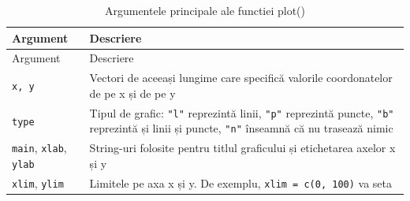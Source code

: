 \documentclass[]{article}
\begin{document}
\begin{longtable}[]{@{}ll@{}}
\caption{Argumentele principale ale functiei plot()}\tabularnewline
\toprule
\begin{minipage}[b]{0.18\columnwidth}\raggedright\strut
Argument\strut
\end{minipage} & \begin{minipage}[b]{0.67\columnwidth}\raggedright\strut
Descriere\strut
\end{minipage}\tabularnewline
\midrule
\endfirsthead
\toprule
\begin{minipage}[b]{0.18\columnwidth}\raggedright\strut
Argument\strut
\end{minipage} & \begin{minipage}[b]{0.67\columnwidth}\raggedright\strut
Descriere\strut
\end{minipage}\tabularnewline
\midrule
\endhead
\begin{minipage}[t]{0.18\columnwidth}\raggedright\strut
\texttt{x,\ y}\strut
\end{minipage} & \begin{minipage}[t]{0.67\columnwidth}\raggedright\strut
Vectori de aceeași lungime care specifică valorile coordonatelor de pe x
și de pe y\strut
\end{minipage}\tabularnewline
\begin{minipage}[t]{0.18\columnwidth}\raggedright\strut
\texttt{type}\strut
\end{minipage} & \begin{minipage}[t]{0.67\columnwidth}\raggedright\strut
Tipul de grafic: \texttt{"l"} reprezintă linii, \texttt{"p"} reprezintă
puncte, \texttt{"b"} reprezintă și linii și puncte, \texttt{"n"}
înseamnă că nu trasează nimic\strut
\end{minipage}\tabularnewline
\begin{minipage}[t]{0.18\columnwidth}\raggedright\strut
\texttt{main}, \texttt{xlab}, \texttt{ylab}\strut
\end{minipage} & \begin{minipage}[t]{0.67\columnwidth}\raggedright\strut
String-uri folosite pentru titlul graficului și etichetarea axelor x și
y\strut
\end{minipage}\tabularnewline
\begin{minipage}[t]{0.18\columnwidth}\raggedright\strut
\texttt{xlim}, \texttt{ylim}\strut
\end{minipage} & \begin{minipage}[t]{0.67\columnwidth}\raggedright\strut
Limitele pe axa x și y. De exemplu, \texttt{xlim\ =\ c(0,\ 100)} va seta

\end{minipage}
\end{longtable}
\end{document}
